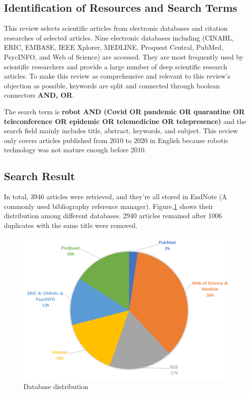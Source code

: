 \documentclass[a4paper]{article}
\begin{document}
\subsection{Identification of Resources and Search Terms}
    This review selects scientific articles from electronic databases and citation researches of selected articles. 
Nine electronic databases including (CINAHL, ERIC, EMBASE, IEEE Xplorer, MEDLINE, Proquest Central, PubMed, PsycINFO, and Web of Science) are accessed. They are most frequently used by scientific researchers and provide a large number of deep scientific research articles. To make this review as comprehensive and relevant to this review's objection as possible, keywords are split and connected through boolean connectors \textbf{AND, OR}.
\par 
    The search term is \textbf{robot AND (Covid OR pandemic OR quarantine OR teleconference OR epidemic OR telemedicine OR telepresence)} and the search field mainly includes title, abstract, keywords, and subject. This review only covers articles published from 2010 to 2020 in English because robotic technology was not mature enough before 2010. 
\subsection{Search Result}
    In total, 3946 articles were retrieved, and they're all stored in EndNote (A commonly used bibliography reference manager). Figure.\ref{Database1} shows their distribution among different databases. 2940 articles remained after 1006 duplicates with the same title were removed.
\begin{figure}[H]
    \centering
    \includegraphics[scale=0.15]{Database.png}
    \caption{Database distribution}
    \label{Database1}
\end{figure}
\end{document}
